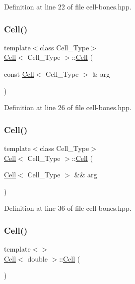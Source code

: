 Definition at line 22 of file cell-\/bones.\+hpp.

\mbox{\label{class_cell_ab745c6f11e7f43f06318b4bb733d9474}} 
\subsubsection{\texorpdfstring{Cell()}{Cell()}\hspace{0.1cm}{\footnotesize\ttfamily [5/10]}}
{\footnotesize\ttfamily template$<$class Cell\+\_\+\+Type$>$ \\
\hyperlink{class_cell}{Cell}$<$ Cell\+\_\+\+Type $>$\+::\hyperlink{class_cell}{Cell} (\begin{DoxyParamCaption}\item[{const \hyperlink{class_cell}{Cell}$<$ Cell\+\_\+\+Type $>$ \&}]{arg }\end{DoxyParamCaption})\hspace{0.3cm}{\ttfamily [inline]}}



Definition at line 26 of file cell-\/bones.\+hpp.

\mbox{\label{class_cell_abe27b0c411864d9fce33a1cffe918169}} 
\subsubsection{\texorpdfstring{Cell()}{Cell()}\hspace{0.1cm}{\footnotesize\ttfamily [6/10]}}
{\footnotesize\ttfamily template$<$class Cell\+\_\+\+Type$>$ \\
\hyperlink{class_cell}{Cell}$<$ Cell\+\_\+\+Type $>$\+::\hyperlink{class_cell}{Cell} (\begin{DoxyParamCaption}\item[{\hyperlink{class_cell}{Cell}$<$ Cell\+\_\+\+Type $>$ \&\&}]{arg }\end{DoxyParamCaption})\hspace{0.3cm}{\ttfamily [inline]}}



Definition at line 36 of file cell-\/bones.\+hpp.

\mbox{\label{class_cell_a5ecdaddaf4661a9a8fe6f0ed61595847}} 
\subsubsection{\texorpdfstring{Cell()}{Cell()}\hspace{0.1cm}{\footnotesize\ttfamily [7/10]}}
{\footnotesize\ttfamily template$<$$>$ \\
\hyperlink{class_cell}{Cell}$<$ double $>$\+::\hyperlink{class_cell}{Cell} (\begin{DoxyParamCaption}{ }\end{DoxyParamCaption})\hspace{0.3cm}{\ttfamily [inline]}}



